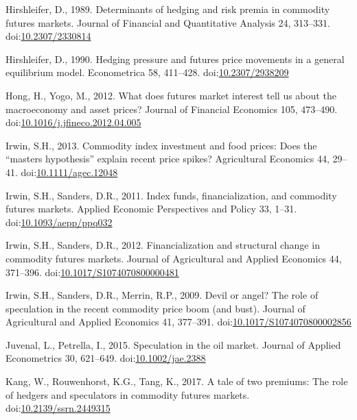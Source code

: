 \documentclass[]{elsarticle} %
\begin{document}
\leavevmode\hypertarget{ref-hirshleifer_determinants_1989}{}%
Hirshleifer, D., 1989. Determinants of hedging and risk premia in
commodity futures markets. Journal of Financial and Quantitative
Analysis 24, 313--331.
doi:\href{https://doi.org/10.2307/2330814}{10.2307/2330814}

\leavevmode\hypertarget{ref-hirshleifer_hedging_1990}{}%
Hirshleifer, D., 1990. Hedging pressure and futures price movements in a
general equilibrium model. Econometrica 58, 411--428.
doi:\href{https://doi.org/10.2307/2938209}{10.2307/2938209}

\leavevmode\hypertarget{ref-hong_what_2012}{}%
Hong, H., Yogo, M., 2012. What does futures market interest tell us
about the macroeconomy and asset prices? Journal of Financial Economics
105, 473--490.
doi:\href{https://doi.org/10.1016/j.jfineco.2012.04.005}{10.1016/j.jfineco.2012.04.005}

\leavevmode\hypertarget{ref-irwin_commodity_2013}{}%
Irwin, S.H., 2013. Commodity index investment and food prices: Does the
``masters hypothesis'' explain recent price spikes? Agricultural
Economics 44, 29--41.
doi:\href{https://doi.org/10.1111/agec.12048}{10.1111/agec.12048}

\leavevmode\hypertarget{ref-irwin_index_2011}{}%
Irwin, S.H., Sanders, D.R., 2011. Index funds, financialization, and
commodity futures markets. Applied Economic Perspectives and Policy 33,
1--31.
doi:\href{https://doi.org/10.1093/aepp/ppq032}{10.1093/aepp/ppq032}

\leavevmode\hypertarget{ref-irwin_financialization_2012}{}%
Irwin, S.H., Sanders, D.R., 2012. Financialization and structural change
in commodity futures markets. Journal of Agricultural and Applied
Economics 44, 371--396.
doi:\href{https://doi.org/10.1017/S1074070800000481}{10.1017/S1074070800000481}

\leavevmode\hypertarget{ref-irwin_devil_2009}{}%
Irwin, S.H., Sanders, D.R., Merrin, R.P., 2009. Devil or angel? The role
of speculation in the recent commodity price boom (and bust). Journal of
Agricultural and Applied Economics 41, 377--391.
doi:\href{https://doi.org/10.1017/S1074070800002856}{10.1017/S1074070800002856}

\leavevmode\hypertarget{ref-juvenal_speculation_2015}{}%
Juvenal, L., Petrella, I., 2015. Speculation in the oil market. Journal
of Applied Econometrics 30, 621--649.
doi:\href{https://doi.org/10.1002/jae.2388}{10.1002/jae.2388}

\leavevmode\hypertarget{ref-kang_tale_2017}{}%
Kang, W., Rouwenhorst, K.G., Tang, K., 2017. A tale of two premiums: The
role of hedgers and speculators in commodity futures markets.
doi:\href{https://doi.org/10.2139/ssrn.2449315}{10.2139/ssrn.2449315}
\end{document}
